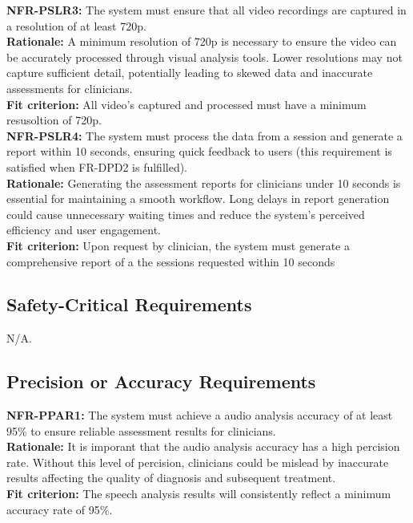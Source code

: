 \documentclass[12pt]{article}
\begin{document}
\noindent\textbf{NFR-PSLR3: }The system must ensure that all video recordings are captured in a resolution of at least 720p.\\
\textbf{Rationale: }A minimum resolution of 720p is necessary to ensure the video can be accurately processed through visual analysis tools. Lower resolutions may not capture sufficient detail, potentially leading to skewed data and inaccurate assessments for clinicians.\\
\textbf{Fit criterion: }All video's captured and processed must have a minimum resusoltion of 720p.\\

\noindent\textbf{NFR-PSLR4: }The system must process the data from a session and generate a report within 10 seconds, ensuring quick feedback to users (this requirement is satisfied when FR-DPD2 is fulfilled).\\
\textbf{Rationale: }Generating the assessment reports for clinicians under 10 seconds is essential for maintaining a smooth workflow. Long delays in report generation could cause unnecessary waiting times and reduce the system's perceived efficiency and user engagement.\\
\textbf{Fit criterion: }Upon request by clinician, the system must generate a comprehensive report of a the sessions requested within 10 seconds\\

\subsection{Safety-Critical Requirements}
\color{red} N/A. \color{black}
\subsection{Precision or Accuracy Requirements}

\noindent\textbf{NFR-PPAR1: }The system must achieve a audio analysis accuracy of at least 95\% to ensure reliable assessment results for clinicians.\\
\textbf{Rationale: }It is imporant that the audio analysis accuracy has a high percision rate. Without this level of percision, clinicians could 
be mislead by inaccurate results affecting the quality of diagnosis and subsequent treatment.\\
\textbf{Fit criterion: }The speech analysis results will consistently reflect a minimum accuracy rate of 95\%.\\
\end{document}
